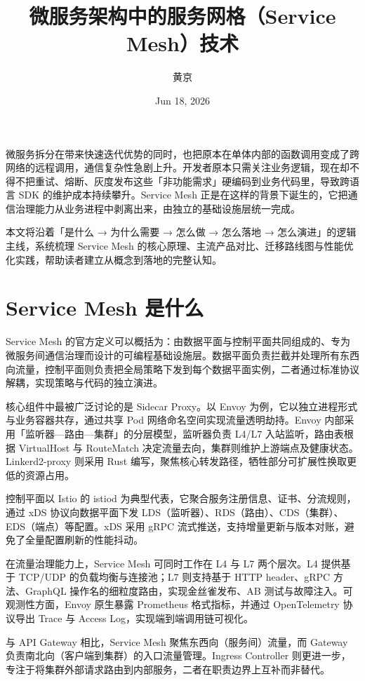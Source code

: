 \title{微服务架构中的服务网格（Service Mesh）技术}
\author{黄京}
\date{Jun 18, 2026}
\maketitle
微服务拆分在带来快速迭代优势的同时，也把原本在单体内部的函数调用变成了跨网络的远程调用，通信复杂性急剧上升。开发者原本只需关注业务逻辑，现在却不得不把重试、熔断、灰度发布这些「非功能需求」硬编码到业务代码里，导致跨语言 SDK 的维护成本持续攀升。Service Mesh 正是在这样的背景下诞生的，它把通信治理能力从业务进程中剥离出来，由独立的基础设施层统一完成。\par
本文将沿着「是什么 → 为什么需要 → 怎么做 → 怎么落地 → 怎么演进」的逻辑主线，系统梳理 Service Mesh 的核心原理、主流产品对比、迁移路线图与性能优化实践，帮助读者建立从概念到落地的完整认知。\par
\chapter{Service Mesh 是什么}
Service Mesh 的官方定义可以概括为：由数据平面与控制平面共同组成的、专为微服务间通信治理而设计的可编程基础设施层。数据平面负责拦截并处理所有东西向流量，控制平面则负责把全局策略下发到每个数据平面实例，二者通过标准协议解耦，实现策略与代码的独立演进。\par
核心组件中最被广泛讨论的是 Sidecar Proxy。以 Envoy 为例，它以独立进程形式与业务容器共存，通过共享 Pod 网络命名空间实现流量透明劫持。Envoy 内部采用「监听器—路由—集群」的分层模型，监听器负责 L4/L7 入站监听，路由表根据 VirtualHost 与 RouteMatch 决定流量去向，集群则维护上游端点及健康状态。Linkerd2-proxy 则采用 Rust 编写，聚焦核心转发路径，牺牲部分可扩展性换取更低的资源占用。\par
控制平面以 Istio 的 istiod 为典型代表，它聚合服务注册信息、证书、分流规则，通过 xDS 协议向数据平面下发 LDS（监听器）、RDS（路由）、CDS（集群）、EDS（端点）等配置。xDS 采用 gRPC 流式推送，支持增量更新与版本对账，避免了全量配置刷新的性能抖动。\par
在流量治理能力上，Service Mesh 可同时工作在 L4 与 L7 两个层次。L4 提供基于 TCP/UDP 的负载均衡与连接池；L7 则支持基于 HTTP header、gRPC 方法、GraphQL 操作名的细粒度路由，实现金丝雀发布、AB 测试与故障注入。可观测性方面，Envoy 原生暴露 Prometheus 格式指标，并通过 OpenTelemetry 协议导出 Trace 与 Access Log，实现端到端调用链可视化。\par
与 API Gateway 相比，Service Mesh 聚焦东西向（服务间）流量，而 Gateway 负责南北向（客户端到集群）的入口流量管理。Ingress Controller 则更进一步，专注于将集群外部请求路由到内部服务，二者在职责边界上互补而非替代。\par
